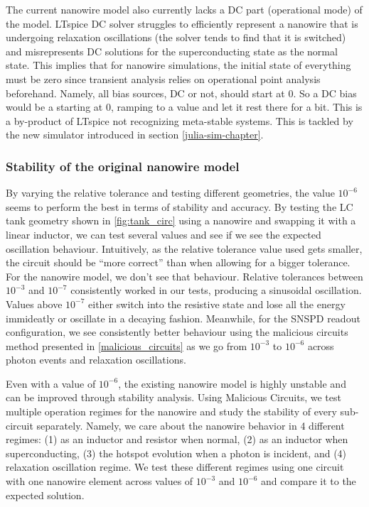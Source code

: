 The current nanowire model also currently lacks a DC part (operational mode) 
of the model.
LTspice DC solver struggles to efficiently represent a nanowire that is
undergoing relaxation oscillations (the solver tends to find that it is
switched) and misrepresents DC solutions for the superconducting state
as the normal state. This implies that for nanowire simulations,
the initial state of everything must be zero since transient analysis relies
on operational point analysis beforehand. Namely, all bias sources,
DC or not, should start at $0$. So a DC bias would be a  starting
at 0, ramping to a value and let it rest there for a bit. This is a by-product 
of LTspice not recognizing meta-stable systems. This is tackled by the new 
simulator introduced in section \ref{julia-sim-chapter}.

\subsubsection{Stability of the original nanowire model}

By varying the relative tolerance and testing different geometries, the value $10^{-6}$
seems to perform the best in terms of stability and accuracy. By testing the LC tank
geometry shown in \ref{fig:tank_circ} using a nanowire and swapping it with a linear 
inductor, we can test several  values and see if we see the expected 
oscillation behaviour. Intuitively, as the relative tolerance value used gets smaller,
the circuit should be ``more correct'' than when allowing for a bigger tolerance.
For the nanowire model, we don't see that behaviour. Relative tolerances between $10^{-3}$
and $10^{-7}$
consistently worked in our tests, producing a sinusoidal oscillation. Values
above $10^{-7}$ either switch into the resistive state and lose all the energy immideatly
or oscillate in a decaying fashion. Meanwhile, for the SNSPD readout configuration,
we see consistently better behaviour using the malicious circuits method presented in
\ref{malicious_circuits} as we go from $10^{-3}$ to $10^{-6}$ across photon events
and relaxation oscillations.

Even with a  value of $10^{-6}$, the existing nanowire model is highly unstable
and can be improved through stability analysis.
Using Malicious Circuits, we test multiple operation regimes for
the nanowire and study the stability of every sub-circuit separately. Namely,
we care about the nanowire behavior in 4 different regimes: 
(1) as an inductor and resistor when normal, 
(2) as an inductor when superconducting, (3) the hotspot evolution when a photon is
incident, and (4) relaxation oscillation regime. We test these different regimes 
using one circuit with one nanowire element across  values of $10^{-3}$
and $10^{-6}$ and compare it to the expected solution.

